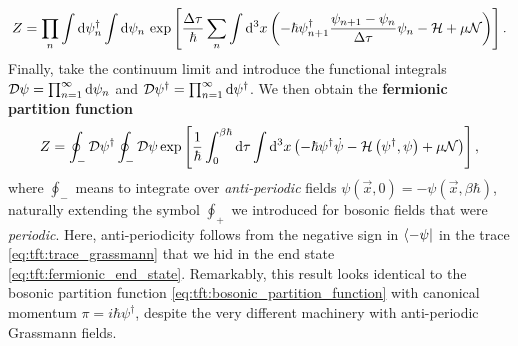 \begin{equation}
	Z = \prod_n \int \mathop{}\!\mathrm{d} \psi_n^\dagger \int \mathop{}\!\mathrm{d} \psi_n \, \exp \left[ \frac{\Delta \tau}{\hbar} \sum_n \int \mathop{}\!\mathrm{d}^3 x \left( -\hbar \psi^\dagger_{n+1} \frac{\psi_{n+1} - \psi_n}{\Delta \tau} \psi_{n} - \mathcal{H} + \mu \mathcal{N} \right) \right] .
\end{equation}
Finally, take the continuum limit and introduce the functional integrals $\mathcal{D} \psi = \prod_{n=1}^\infty \mathop{}\!\mathrm{d} \psi_n$ and $\mathcal{D} \psi^\dagger = \prod_{n=1}^\infty \mathop{}\!\mathrm{d} \psi^\dagger$. 
We then obtain the \textbf{fermionic partition function}
\begin{equation}
	Z = \oint_- \mathcal{D} \psi^\dagger \oint_- \mathcal{D} \psi \exp \left[ \frac{1}{\hbar} \int_0^{\beta \hbar} \mathop{}\!\mathrm{d} \tau \int \mathop{}\!\mathrm{d}^3 x \left( -\hbar \psi^\dagger \dot{\psi} - \mathcal{H} \left( \psi^\dagger, \psi \right) + \mu \mathcal{N} \right) \right] ,
\label{eq:tft:fermion_partition_function}
\end{equation}
where $\oint_-$ means to integrate over \emph{anti-periodic} fields $\psi(\vec{x}, 0) = -\psi(\vec{x}, \beta \hbar)$, naturally extending the symbol $\oint_+$ we introduced for bosonic fields that were \emph{periodic}.
Here, anti-periodicity follows from the negative sign in $\bra{-\psi}$ in the trace \eqref{eq:tft:trace_grassmann} that we hid in the end state \eqref{eq:tft:fermionic_end_state}.
Remarkably, this result looks identical to the bosonic partition function \eqref{eq:tft:bosonic_partition_function} with canonical momentum $\pi = i \hbar \psi^\dagger$, despite the very different machinery with anti-periodic Grassmann fields.

